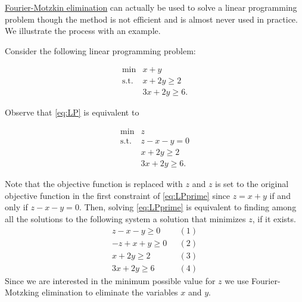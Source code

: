 \protect\hyperlink{fm}{Fourier-Motzkin elimination} can actually be used
to solve a linear programming problem though the method is not efficient
and is almost never used in practice. We illustrate the process with an
example.

Consider the following linear programming problem:

\begin{equation}
\begin{array}{rl}
\min & x + y \\
\text{s.t.}
& x + 2y  \geq 2 \\
& 3x + 2y  \geq 6.
\end{array}\label{eq:LP}
\end{equation}

Observe that \eqref{eq:LP} is equivalent to

\begin{equation}
\begin{array}{rl}
\min & z \\
\text{s.t.}
& z - x - y = 0 \\
& x + 2y  \geq 2 \\
& 3x + 2y  \geq 6.
\end{array}\label{eq:LPprime}
\end{equation}

Note that the objective function is replaced with \(z\) and \(z\) is set
to the original objective function in the first constraint of
\eqref{eq:LPprime} since \(z = x+ y\) if and only if \(z-x-y=0\). Then,
solving \eqref{eq:LPprime} is equivalent to finding among all the
solutions to the following system a solution that minimizes \(z\), if it
exists. \[
\begin{array}{rl}
 z - x - y \geq 0 & ~~~(1) \\
-z + x + y \geq 0 & ~~~(2) \\
 x + 2y  \geq 2 &~~~(3)\\
 3x + 2y  \geq 6 & ~~~(4)
\end{array}
\] Since we are interested in the minimum possible value for \(z\) we
use Fourier-Motzking elimination to eliminate the variables \(x\) and
\(y\).

